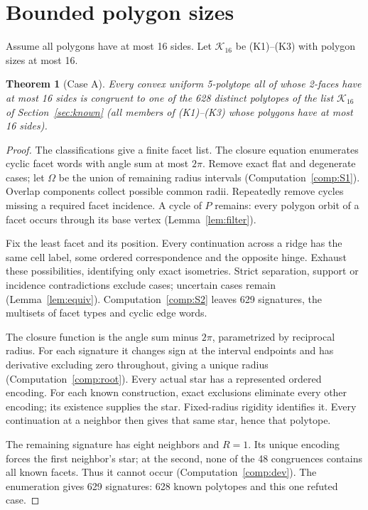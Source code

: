 \documentclass[11pt]{article}
\newtheorem{theorem}{Theorem}
\theoremstyle{definition}
\theoremstyle{remark}
\begin{document}
\section{Bounded polygon sizes}\label{sec:caseA}\label{sec:known}
Assume all polygons have at most 16 sides. Let $\mathcal K_{16}$ be (K1)--(K3) with polygon sizes at most 16.

\begin{theorem}[Case A]\label{thm:A}
Every convex uniform 5-polytope all of whose 2-faces have at most 16 sides
is congruent to one of the 628 distinct polytopes of the list $\mathcal
K_{16}$ of Section~\ref{sec:known} (all members of (K1)--(K3) whose
polygons have at most 16 sides).
\end{theorem}
\begin{proof}
The classifications give a finite facet list.
The closure equation enumerates cyclic facet words with angle sum at most
$2\pi$. Remove exact flat and degenerate cases; let $\Omega$ be the union
of remaining radius intervals (Computation~\ref{comp:S1}). Overlap components collect possible common
radii. Repeatedly remove cycles missing a required facet incidence.
A cycle of $P$ remains: every polygon orbit of a facet occurs through
its base vertex (Lemma~\ref{lem:filter}).

Fix the least facet and its position. Every continuation across a ridge
has the same cell label, some ordered correspondence and the opposite
hinge. Exhaust these possibilities, identifying only exact isometries.
Strict separation, support or incidence contradictions exclude cases;
uncertain cases remain (Lemma~\ref{lem:equiv}).
Computation~\ref{comp:S2} leaves 629 signatures, the multisets of facet types and cyclic edge words.

The closure function is the angle sum minus $2\pi$, parametrized by reciprocal radius. For each signature it changes sign at the interval
endpoints and has derivative excluding zero throughout, giving a unique radius (Computation~\ref{comp:root}). Every actual star has a represented ordered encoding.
For each known construction, exact exclusions eliminate every
other encoding; its existence supplies the star.
Fixed-radius rigidity identifies it. Every continuation at a neighbor
then gives that same star, hence that polytope.

The remaining signature has eight neighbors and $R=1$.
Its unique encoding forces the first neighbor's star; at the second,
none of the 48 congruences contains all known facets.
Thus it cannot occur (Computation~\ref{comp:dev}). The enumeration gives 629 signatures: 628 known polytopes and this one refuted case.\end{proof}
\end{document}
